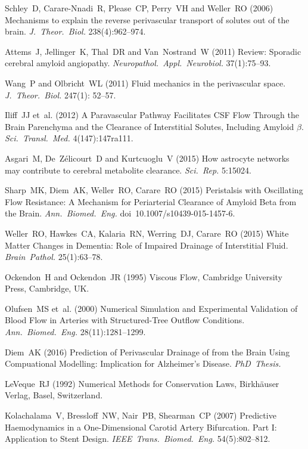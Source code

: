 \documentclass[a4paper,titlepage]{scrartcl}
\begin{document}
\begin{thebibliography}{10}
Schley~D, Carare-Nnadi~R, Please~CP, Perry~VH and Weller~RO (2006) Mechanisms to explain the reverse perivascular transport of solutes out of the brain. {\em J.~Theor.~Biol.} 238(4):962--974.

Attems~J, Jellinger~K, Thal~DR and Van~Nostrand~W (2011) Review: Sporadic cerebral amyloid angiopathy. {\em Neuropathol.~Appl.~Neurobiol.} 37(1):75--93.

Wang~P and Olbricht~WL (2011) Fluid mechanics in the perivascular space. {\em J.~Theor.~Biol.} 247(1): 52--57.

Iliff~JJ et~al. (2012) A Paravascular Pathway Facilitates CSF Flow Through the Brain Parenchyma and the Clearance of Interstitial Solutes, Including Amyloid $\beta$. {\em Sci.~Transl.~Med.} 4(147):147ra111.

Asgari~M, De~Z\'elicourt~D and Kurtcuoglu~V (2015) How astrocyte networks may contribute to cerebral metabolite clearance. {\em Sci.~Rep.} 5:15024.

Sharp~MK, Diem~AK, Weller~RO, Carare~RO (2015) Peristalsis with Oscillating Flow Resistance: A Mechanism for Periarterial Clearance of Amyloid Beta from the Brain. {\em Ann.~Biomed.~Eng.} doi~10.1007/s10439-015-1457-6.

Weller~RO, Hawkes~CA, Kalaria~RN, Werring~DJ, Carare~RO (2015) White Matter Changes in Dementia: Role of Impaired Drainage of Interstitial Fluid. {\em Brain~Pathol.} 25(1):63--78.

Ockendon~H and Ockendon~JR (1995) Viscous Flow, Cambridge University Press, Cambridge, UK.

Olufsen~MS et~al. (2000) Numerical Simulation and Experimental Validation of Blood Flow in Arteries with Structured-Tree Outflow Conditions. {\em Ann.~Biomed.~Eng.} 28(11):1281--1299.

Diem~AK (2016) Prediction of Perivascular Drainage of \Ab from the Brain Using Compuational Modelling: Implication for Alzheimer's Disease. {\em PhD~Thesis.}

LeVeque~RJ (1992) Numerical Methods for Conservation Laws, Birkh\"auser Verlag, Basel, Switzerland.

Kolachalama~V, Bressloff~NW, Nair~PB, Shearman~CP (2007) Predictive Haemodynamics in a One-Dimensional Carotid Artery Bifurcation. Part I: Application to Stent Design. {\em IEEE~Trans.~Biomed.~Eng.} 54(5):802--812.


\end{thebibliography}
\end{document}
